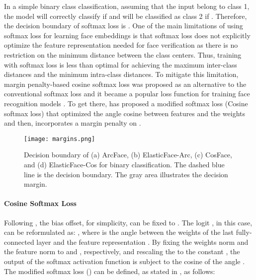 \documentclass[letterpaper, 10 pt, conference]{ieeeconf}  \usepackage{times}
\begin{document}
In a simple binary class classification, assuming that the input  belong to class 1, the model will correctly classify   if   and  will be classified as class 2 if . Therefore, the decision boundary of softmax loss is .
One of the main limitations of using softmax loss for learning face embeddings is that softmax loss does not explicitly optimize the feature representation needed for face verification as there is no restriction on the minimum distance between the class centers.
Thus, training with softmax loss is less than optimal for achieving the maximum inter-class distances and the minimum intra-class distances.
To mitigate this limitation,  margin penalty-based cosine softmax loss was proposed as an alternative to the conventional softmax loss and it became a popular loss function for training face recognition models \cite{deng2019arcface,DBLP:conf/cvpr/WangWZJGZL018,DBLP:conf/cvpr/LiuWYLRS17}. 
To get there, \cite{DBLP:conf/cvpr/LiuWYLRS17} has proposed a modified softmax loss (Cosine softmax loss) that optimized the angle cosine between features and the weights  and then, incorporates a margin penalty on .







\begin{figure*}[ht!]
     \centering
        \texttt{[image: margins.png]}
    \caption{Decision boundary of (a) ArcFace, (b) ElasticFace-Arc, (c) CosFace, and (d) ElasticFace-Cos for binary classification. The dashed blue line is the decision boundary. The gray area illustrates the decision margin.}
    \label{fig:marg}
\end{figure*}
\paragraph{Cosine Softmax Loss}
Following \cite{deng2019arcface,DBLP:conf/cvpr/WangWZJGZL018,DBLP:conf/cvpr/LiuWYLRS17,DBLP:conf/icml/LiuWYY16}, the bias offset, for simplicity, can be fixed to . The logit , in this case, can be reformulated as:  , where  is the angle between the weights of the last fully-connected layer  and the feature representation . By fixing the weights norm and the feature norm to  and , respectively, and rescaling the  to the constant  \cite{DBLP:conf/cvpr/WangWZJGZL018}, the output of the softmax activation function is subject to the cosine of the angle .
The modified softmax loss () can be defined, as  stated in \cite{DBLP:conf/cvpr/WangWZJGZL018,DBLP:conf/cvpr/LiuWYLRS17}, as follows:
\end{document}

